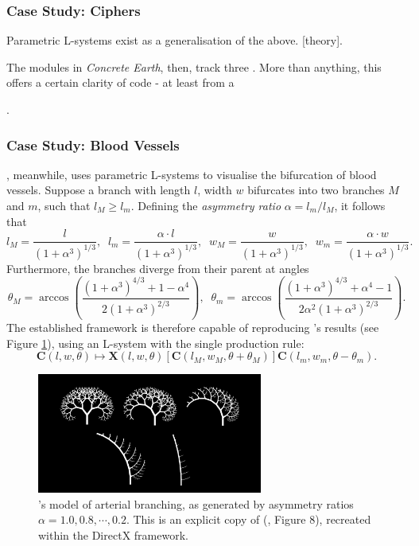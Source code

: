 \documentclass[a4paper, 11pt]{article}
\begin{document}
\begin{flushleft}
\subsubsection{Case Study: Ciphers}

Parametric L-systems \citep{hananParametricLSystems} exist as a generalisation of the above. [theory].

\vspace{5pt}\noindent
The modules in \textit{Concrete Earth}, then, track three . More than anything, this offers a certain clarity of code - at least from a 

\vspace{5pt}.

\subsubsection{Case Study: Blood Vessels} %

\citet{zamirArterialBranchingLSystems}, meanwhile, uses parametric L-systems to visualise the bifurcation of blood vessels. Suppose a branch with length $l$, width $w$ bifurcates into two branches $M$ and $m$, such that $l_M \geq l_m$. Defining the \textit{asymmetry ratio} $\alpha = l_m/l_M$, it follows that
$$l_M = \frac{l}{\left(1+\alpha^3\right)^{1/3}}, \;\; l_m = \frac{\alpha\cdot l}{\left(1+\alpha^3\right)^{1/3}}, \;\; w_M = \frac{w}{\left(1+\alpha^3\right)^{1/3}}, \;\; w_m = \frac{\alpha\cdot w}{\left(1+\alpha^3\right)^{1/3}}.$$
Furthermore, the branches diverge from their parent at angles
$$\theta_M = \arccos\left(\frac{\left(1+\alpha^3\right)^{4/3}+1-\alpha^4}{2\left(1+\alpha^3\right)^{2/3}}\right), \;\; \theta_m = \arccos\left(\frac{\left(1+\alpha^3\right)^{4/3}+\alpha^4-1}{2\alpha^2\left(1+\alpha^3\right)^{2/3}}\right).$$
The established framework is therefore capable of reproducing \citeauthor{zamirArterialBranchingLSystems}'s results (see Figure \ref{Zamir's Model}), using an L-system with the single production rule:  
$$\mathbf{C}(l,w,\theta) \mapsto \mathbf{X}(l,w,\theta)[\mathbf{C}(l_M,w_M,\theta+\theta_M)]\mathbf{C}(l_m,w_m,\theta-\theta_m).$$

\begin{figure}[h]
\centering
\includegraphics[width=0.66\textwidth]{Zamir's Model}
\caption{\citeauthor{zamirArterialBranchingLSystems}'s model of arterial branching, as generated by asymmetry ratios $\alpha = 1.0, 0.8, \cdots, 0.2$. This is an explicit copy of \citeauthor{zamirArterialBranchingLSystems} (\citeyear{zamirArterialBranchingLSystems}, Figure 8), recreated within the DirectX framework.}
\label{Zamir's Model}
\end{figure}


\end{flushleft}
\end{document}
